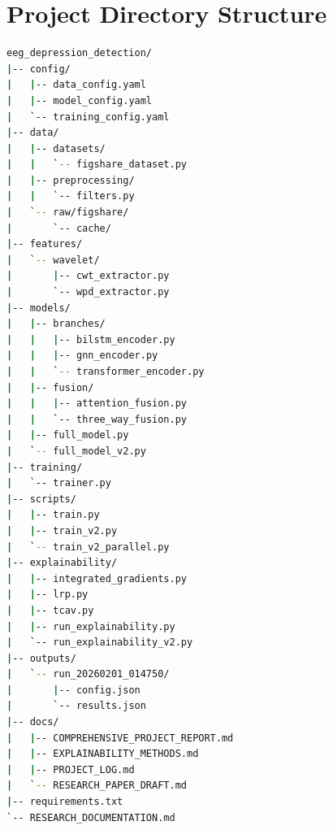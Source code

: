 \section{Project Directory Structure}

\begin{lstlisting}[language=bash, caption={Project Directory Tree}]
eeg_depression_detection/
|-- config/
|   |-- data_config.yaml
|   |-- model_config.yaml
|   `-- training_config.yaml
|-- data/
|   |-- datasets/
|   |   `-- figshare_dataset.py
|   |-- preprocessing/
|   |   `-- filters.py
|   `-- raw/figshare/
|       `-- cache/
|-- features/
|   `-- wavelet/
|       |-- cwt_extractor.py
|       `-- wpd_extractor.py
|-- models/
|   |-- branches/
|   |   |-- bilstm_encoder.py
|   |   |-- gnn_encoder.py
|   |   `-- transformer_encoder.py
|   |-- fusion/
|   |   |-- attention_fusion.py
|   |   `-- three_way_fusion.py
|   |-- full_model.py
|   `-- full_model_v2.py
|-- training/
|   `-- trainer.py
|-- scripts/
|   |-- train.py
|   |-- train_v2.py
|   `-- train_v2_parallel.py
|-- explainability/
|   |-- integrated_gradients.py
|   |-- lrp.py
|   |-- tcav.py
|   |-- run_explainability.py
|   `-- run_explainability_v2.py
|-- outputs/
|   `-- run_20260201_014750/
|       |-- config.json
|       `-- results.json
|-- docs/
|   |-- COMPREHENSIVE_PROJECT_REPORT.md
|   |-- EXPLAINABILITY_METHODS.md
|   |-- PROJECT_LOG.md
|   `-- RESEARCH_PAPER_DRAFT.md
|-- requirements.txt
`-- RESEARCH_DOCUMENTATION.md
\end{lstlisting}
